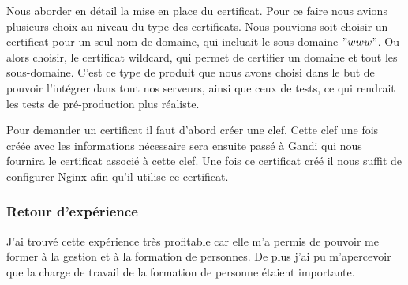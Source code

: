 Nous aborder en détail la mise en place du certificat. Pour ce faire nous avions plusieurs choix au niveau du type des certificats. Nous pouvions soit choisir un certificat pour un seul nom de domaine, qui incluait le sous-domaine $"www"$. Ou alors choisir, le certificat wildcard, qui permet de certifier un domaine et tout les sous-domaine. C'est ce type de produit que nous avons choisi dans le but de pouvoir l'intégrer dans tout nos serveurs, ainsi que ceux de tests, ce qui rendrait les tests de pré-production plus réaliste.

Pour demander un certificat il faut d'abord créer une clef. Cette clef une fois créée avec les informations nécessaire sera ensuite passé à Gandi qui nous fournira le certificat associé à cette clef. Une fois ce certificat créé il nous suffit de configurer Nginx afin qu'il utilise ce certificat.

\subsubsection{Retour d'expérience}

J'ai trouvé cette expérience très profitable car elle m'a permis de pouvoir me former à la gestion et à la formation de personnes. De plus j'ai pu m’apercevoir que la charge de travail de la formation de personne étaient importante.
